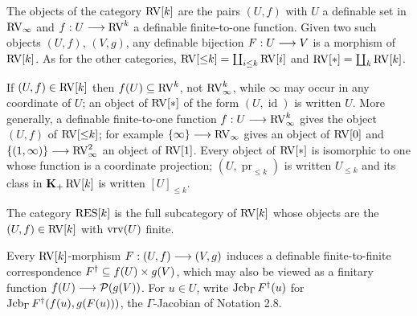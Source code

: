\setcounter{theorem}{7}
\begin{definition}[$\RV$-categories]
\label{defn-c-RV-cat}
\leanok
The objects of the category $\mathrm{RV}[k]$ are the pairs $(U, f)$ with $U$ a definable set in $\mathrm{RV}_\infty$ and $f : U \longrightarrow \mathrm{RV}^k$ a definable finite-to-one function. Given two such objects $(U, f)$, $(V, g)$, any definable bijection $F : U \longrightarrow V$ is a morphism of $\mathrm{RV}[k]$. As for the other categories, $\mathrm{RV}[{\leq}k] = \coprod_{i \leq k} \mathrm{RV}[i]$ and $\mathrm{RV}[*] = \coprod_k \mathrm{RV}[k]$.
\end{definition}

\setcounter{theorem}{8}
\begin{definition}
\label{0coor}
\leanok
{}
If $(U, f) \in \mathrm{RV}[k]$ then $f(U) \subseteq \mathrm{RV}^k$, not $\mathrm{RV}^k_\infty$, while $\infty$ may occur in any coordinate of $U$; an object of $\mathrm{RV}[*]$ of the form $(U, \operatorname{id})$ is written $U$. More generally, a definable finite-to-one function $f : U \longrightarrow \mathrm{RV}^k_\infty$ gives the object $(U, f)$ of $\mathrm{RV}[{\leq}k]$; for example $\{\infty\} \longrightarrow \mathrm{RV}_\infty$ gives an object of $\mathrm{RV}[0]$ and $\{(1, \infty)\} \longrightarrow \mathrm{RV}^2_\infty$ an object of $\mathrm{RV}[1]$. Every object of $\mathrm{RV}[*]$ is isomorphic to one whose function is a coordinate projection; $(U, \operatorname{pr}_{\leq k})$ is written $U_{\leq k}$ and its class in $\operatorname{\mathbf{K}_+} \mathrm{RV}[k]$ is written $[U]_{\leq k}$.
\end{definition}

\setcounter{theorem}{9}
\begin{definition}
\label{defn-RES-cat}
\leanok
{}
The category $\mathrm{RES}[k]$ is the full subcategory of $\mathrm{RV}[k]$ whose objects are the $(U, f) \in \mathrm{RV}[k]$ with $\operatorname{vrv}(U)$ finite.
\end{definition}

\setcounter{theorem}{10}
\begin{definition}
\label{mor-ftf}
\leanok
{}
Every $\mathrm{RV}[k]$-morphism $F : (U, f) \longrightarrow (V, g)$ induces a definable finite-to-finite correspondence $F^\dagger \subseteq f(U) \times g(V)$, which may also be viewed as a finitary function $f(U) \longrightarrow \mathcal{P}(g(V))$. For $u \in U$, write $\operatorname{Jcb}_{\Gamma} F^\dagger(u)$ for $\operatorname{Jcb}_{\Gamma} F^\dagger(f(u), g(F(u)))$, the $\Gamma$-Jacobian of Notation 2.8.
\end{definition}

